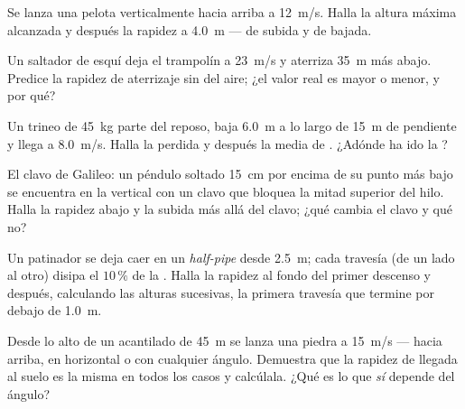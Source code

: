 \begin{exercise}[$\star\star$]\label{exo:g11:mechanical-energy:8}
Se lanza una pelota verticalmente hacia arriba a \qty{12}{m/s}. Halla la
altura máxima alcanzada y después la rapidez a \qty{4.0}{m} --- de
subida y de bajada.
\end{exercise}

\begin{exercise}[$\star\star$]\label{exo:g11:mechanical-energy:9}
Un saltador de esquí deja el trampolín a \qty{23}{m/s} y aterriza
\qty{35}{m} más abajo. Predice la rapidez de aterrizaje sin 
del aire; ¿el valor real es mayor o menor, y por qué?
\end{exercise}

\begin{exercise}[$\star\star$]\label{exo:g11:mechanical-energy:10}
Un trineo de \qty{45}{kg} parte del reposo, baja \qty{6.0}{m} a lo largo
de \qty{15}{m} de pendiente y llega a \qty{8.0}{m/s}. Halla la  perdida y después la  media de . ¿Adónde ha ido
la ?
\end{exercise}

\begin{exercise}[$\star\star$]\label{exo:g11:mechanical-energy:11}
El clavo de Galileo: un péndulo soltado \qty{15}{cm} por encima de su
punto más bajo se encuentra en la vertical con un clavo que bloquea la
mitad superior del hilo. Halla la rapidez abajo y la subida más allá del
clavo; ¿qué cambia el clavo y qué no?
\end{exercise}

\begin{exercise}[$\star\star\star$]\label{exo:g11:mechanical-energy:12}
Un patinador se deja caer en un \emph{half-pipe} desde \qty{2.5}{m};
cada travesía (de un lado al otro) disipa el $10\,\%$ de la . Halla la rapidez al fondo del primer descenso y después,
calculando las alturas sucesivas, la primera travesía que termine por
debajo de \qty{1.0}{m}.
\end{exercise}

\begin{exercise}[$\star\star\star$]\label{exo:g11:mechanical-energy:13}
Desde lo alto de un acantilado de \qty{45}{m} se lanza una piedra a
\qty{15}{m/s} --- hacia arriba, en horizontal o con cualquier ángulo.
Demuestra que la rapidez de llegada al suelo es la misma en todos los
casos y calcúlala. ¿Qué es lo que \emph{sí} depende del ángulo?
\end{exercise}

